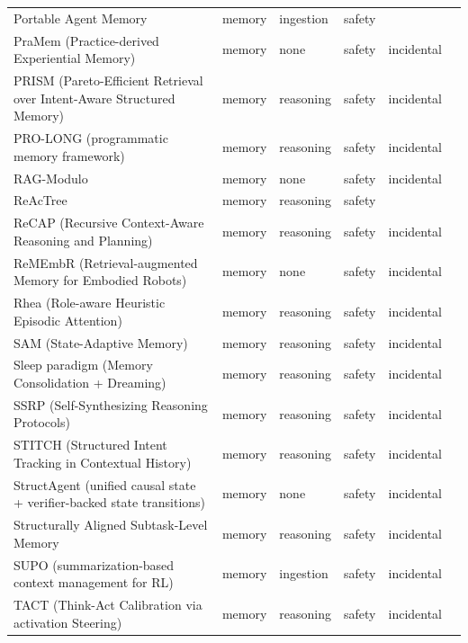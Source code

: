 \begin{longtable}{@{}p{}lllll@{}}
Portable Agent Memory & memory & ingestion & safety &  & \cite{ravindran-2026-portable} \\
PraMem (Practice-derived Experiential Memory) & memory & none & safety & incidental & \cite{li-2026-pramem} \\
PRISM (Pareto-Efficient Retrieval over Intent-Aware Structured Memory) & memory & reasoning & safety & incidental & \cite{peng-2026-prism} \\
PRO-LONG (programmatic memory framework) & memory & reasoning & safety & incidental & \cite{fox-2026-prolong} \\
RAG-Modulo & memory & none & safety & incidental & \cite{jain-2024-ragmodulo} \\
ReAcTree & memory & reasoning & safety &  & \cite{choi-2025-reactree} \\
ReCAP (Recursive Context-Aware Reasoning and Planning) & memory & reasoning & safety & incidental & \cite{zhang-2025-recap} \\
ReMEmbR (Retrieval-augmented Memory for Embodied Robots) & memory & none & safety & incidental & \cite{anwar-2024-remembr} \\
Rhea (Role-aware Heuristic Episodic Attention) & memory & reasoning & safety & incidental & \cite{hong-2025-rhea} \\
SAM (State-Adaptive Memory) & memory & reasoning & safety & incidental & \cite{hu-2026-sam} \\
Sleep paradigm (Memory Consolidation + Dreaming) & memory & reasoning & safety & incidental & \cite{behrouz-2026-language} \\
SSRP (Self-Synthesizing Reasoning Protocols) & memory & reasoning & safety & incidental & \cite{shehata-2026-attention} \\
STITCH (Structured Intent Tracking in Contextual History) & memory & reasoning & safety & incidental & \cite{yang-2026-grounding} \\
StructAgent (unified causal state + verifier-backed state transitions) & memory & none & safety & incidental & \cite{wu-2026-structagent} \\
Structurally Aligned Subtask-Level Memory & memory & reasoning & safety & incidental & \cite{shen-2026-structurally} \\
SUPO (summarization-based context management for RL) & memory & ingestion & safety & incidental & \cite{lu-2025-scaling} \\
TACT (Think-Act Calibration via activation Steering) & memory & reasoning & safety & incidental & \cite{sui-2026-tact} \\

\end{longtable}
